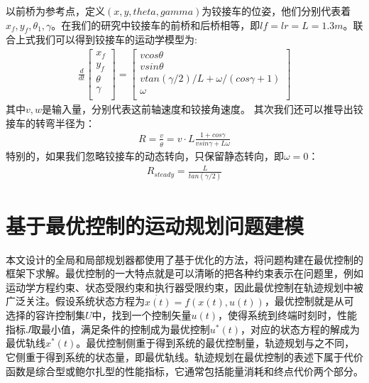 \documentclass[master,academic]{ysuthesis} %
\begin{document}
	以前桥为参考点，定义$(x,y,theta,gamma)$为铰接车的位姿，他们分别代表着$x_f,y_f,\theta_1,\gamma$。在我们的研究中铰接车的前桥和后桥相等，即$lf=lr=L=1.3m$。联合上式我们可以得到铰接车的运动学模型为:
	\begin{equation}
		\begin{aligned}
			\frac{d}{dt}\left[ \begin{array}{c}
				x_f\\
				y_f\\
				\theta\\
				\gamma\\
			\end{array} \right] =\left[ \begin{array}{c}
				vcos\theta\\
				vsin\theta\\
				vtan( \gamma /2 ) /L+\omega /( cos\gamma +1 )\\
				\omega\\
			\end{array} \right] 
		\end{aligned}
		\label{eq:铰接车运动学模型}
	\end{equation}
	其中$v,w$是输入量，分别代表这前轴速度和铰接角速度。
	其次我们还可以推导出铰接车的转弯半径为：
	\begin{equation}
		\begin{aligned}
			R = \frac{v}{\dot{\theta}} = v\cdot L \frac{1+cos\gamma}{vsin\gamma+L\omega }
		\end{aligned}
	\end{equation}
	特别的，如果我们忽略铰接车的动态转向，只保留静态转向，即$\omega=0$：
	\begin{equation}
		\begin{aligned}
			R_{steady} = \frac{L}{tan(\gamma/2)} 
		\end{aligned}
	\end{equation}

		
		
	\section{基于最优控制的运动规划问题建模}
	本文设计的全局和局部规划器都使用了基于优化的方法，将问题构建在最优控制的框架下求解。最优控制的一大特点就是可以清晰的把各种约束表示在问题里，例如运动学方程约束、状态受限约束和执行器受限约束，因此最优控制在轨迹规划中被广泛关注。假设系统状态方程为$\dot{x(t)}=f(x(t),u(t))$，最优控制就是从可选择的容许控制集$U$中，找到一个控制矢量$u(t)$，使得系统到终端时刻时，性能指标$J$取最小值，满足条件的控制成为最优控制$u^{*}(t)$，对应的状态方程的解成为最优轨线$x^{*}(t)$。最优控制侧重于得到系统的最优控制量，轨迹规划与之不同，它侧重于得到系统的状态量，即最优轨线。轨迹规划在最优控制的表述下属于代价函数是综合型或鲍尔扎型的性能指标，它通常包括能量消耗和终点代价两个部分。
	
\end{document}
